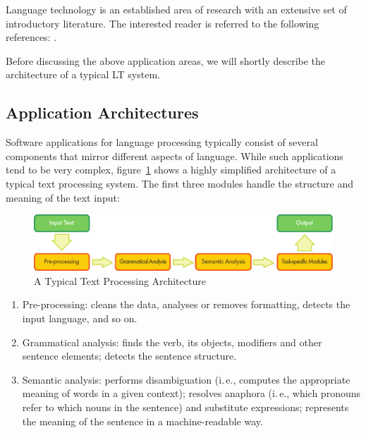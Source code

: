 \begin{multicols}{2}
Language technology is an established area of research with an extensive set of introductory literature. The interested reader is referred to the following references: \cite{carstensen-etal1, jurafsky-martin01, manning-schuetze1, lt-world1, lt-survey1}.

Before discussing the above application areas, we will shortly describe the architecture of a typical LT system.

\subsection{Application Architectures}

Software applications for language processing typically consist of several components that mirror different aspects of language.  While such applications tend to be very complex, figure~\ref{fig:textprocessingarch_en} shows a highly simplified architecture of a typical text processing system. The first three modules handle the structure and meaning of the text input:

\begin{figure}[b]
  \center
  \includegraphics[width=\textwidth]{../_media/english/text_processing_app_architecture}
  \caption{A Typical Text Processing Architecture}
\label{fig:textprocessingarch_en}
\end{figure}

\begin{enumerate}
\item Pre-processing: cleans the data, analyses or removes formatting,
detects the input language, and so on.

\item Grammatical analysis: finds the verb, its objects, modifiers and
other sentence elements; detects the sentence structure.

\item Semantic analysis: performs disambiguation (i.\,e., computes the
appropriate meaning of words in a given context); resolves anaphora
(i.\,e., which pronouns refer to which nouns in the sentence) and
substitute expressions; represents the meaning of the sentence in
a machine-readable way.
\end{enumerate}


\end{multicols}
